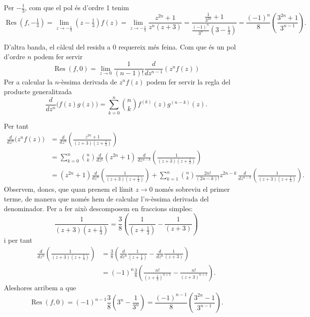 \documentclass[12pt]{article}
\numberwithin{table}{section}
\numberwithin{figure}{section}
\numberwithin{equation}{section}
\DeclareMathOperator{\Res}{Res}
\begin{document}
Per \( -\frac{1}{3} \), com que el pol és d'ordre 1 tenim
\begin{equation*}
	\Res{(f,-\tfrac{1}{3})} = \lim_{z \to -\frac{1}{3}} (z - \tfrac{1}{3})f(z) = \lim_{z \to -\frac{1}{3}} \frac{z^{2n} + 1}{z^n(z+3)} = \frac{\frac{1}{3^{2n}} + 1}{\frac{(-1)^n}{3^n}(3 - \frac{1}{3})} = \frac{(-1)^n}{8} \left(\frac{3^{2n} + 1}{3^{n-1}}\right).
\end{equation*}

D'altra banda, el càlcul del residu a 0 requereix més feina. Com que és un pol d'ordre \( n \) podem fer servir
\begin{equation*}
	\Res{(f,0)} = \lim_{z \to 0} \frac{1}{(n-1)!} \frac{d}{dz^{n-1}}(z^n f(z)) 
\end{equation*}
Per a calcular la \( n \)-èssima derivada de \( z^nf(z) \) podem fer servir la regla del producte generalitzada
\begin{equation*}
	\frac{d}{dz^n}\big(f(z)g(z)\big) = \sum_{k = 0}^{n} \binom{n}{k} f^{(k)}(z) g^{(n - k)}(z).
\end{equation*}

Per tant
\begin{align*}
	\frac{d}{dz^n}\big(z^nf(z)\big) &= \frac{d}{dz^n} \left(\frac{z^{2n} + 1}{(z + 3)(z + \frac{1}{3})}\right) \\
																	&= \sum_{k = 0}^{n} \binom{n}{k} \frac{d}{dz^k}(z^{2n} + 1) \, \frac{d}{dz^{n-k}} \left(\frac{1}{(z+3)(z+\frac{1}{3})}\right) \\
																	&= (z^{2n}+1) \frac{d}{dz^{n}} \left(\frac{1}{(z+3)(z+\frac{1}{3})}\right) + \sum_{k = 1}^{n} \binom{n}{k} \frac{2n!}{(2n - k)!}z^{2n - k} \, \frac{d}{dz^{n-k}} \left(\frac{1}{(z+3)(z+\frac{1}{3})}\right).
\end{align*}
Observem, doncs, que quan prenem el límit \( z \to 0 \) només sobreviu el primer terme, de manera que només hem de calcular l'\( n \)-èssima derivada del denominador. Per a fer això descomposem en fraccions simples:
\begin{equation*}
	\frac{1}{(z+3)(z+\frac{1}{3})} = \frac{3}{8}\left(\frac{1}{(z+\frac{1}{3})} - \frac{1}{(z + 3)}\right)
\end{equation*}
i per tant 
\begin{align*}
	\frac{d}{dz^n}\left(\frac{1}{(z+3)(z+\frac{1}{3})}\right) & = \frac{3}{8}\left(\frac{d}{dz^n}\frac{1}{(z+\frac{1}{3})} - \frac{d}{dz^n}\frac{1}{(z+3)}\right) \\
																														& = (-1)^n \frac{3}{8} \left(\frac{n!}{(z+\frac{1}{3})^{n+1}} - \frac{n!}{(z+3)^{n+1}}\right).
\end{align*}
Aleshores arribem a que
\begin{equation*}
	\Res{(f,0)} = (-1)^{n-1} \frac{3}{8}\left(3^{n} - \frac{1}{3^{n}}\right) = \frac{(-1)^{n-1}}{8}\left(\frac{3^{2n} - 1}{3^{n-1}}\right).
\end{equation*}
\end{document}
